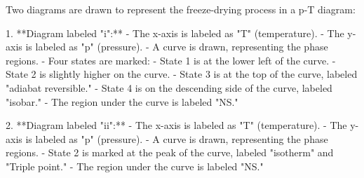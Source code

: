 Two diagrams are drawn to represent the freeze-drying process in a p-T diagram:  

1. **Diagram labeled "i":**  
   - The x-axis is labeled as "T" (temperature).  
   - The y-axis is labeled as "p" (pressure).  
   - A curve is drawn, representing the phase regions.  
   - Four states are marked:  
     - State 1 is at the lower left of the curve.  
     - State 2 is slightly higher on the curve.  
     - State 3 is at the top of the curve, labeled "adiabat reversible."  
     - State 4 is on the descending side of the curve, labeled "isobar."  
   - The region under the curve is labeled "NS."  

2. **Diagram labeled "ii":**  
   - The x-axis is labeled as "T" (temperature).  
   - The y-axis is labeled as "p" (pressure).  
   - A curve is drawn, representing the phase regions.  
   - State 2 is marked at the peak of the curve, labeled "isotherm" and "Triple point."  
   - The region under the curve is labeled "NS."